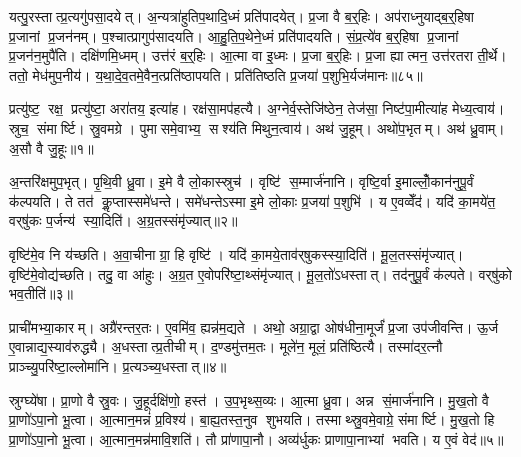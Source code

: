 यत्पु॒रस्तात्प्र॒त्यगु॑पसा॒दयेत्। अ॒न्यत्रा॑हुतिप॒थादि॒ध्मं प्रति॑पादयेत्। प्र॒जा वै ब॒र्॒हिः। अप॑राध्नुयाद्ब॒र्॒हिषा प्र॒जानां प्र॒जन॑नम्। प॒श्चात्प्रागुप॑सादयति। आ॒हु॒ति॒प॒थेने॒ध्मं प्रति॑पादयति। सं॒प्र॒त्ये॑व ब॒र्॒हिषा प्र॒जानां प्र॒जन॑न॒मुपै॑ति। दक्षि॑णमि॒ध्मम्। उत्त॑रं ब॒र्॒हिः। आ॒त्मा वा इ॒ध्मः। प्र॒जा ब॒र्॒हिः। प्र॒जा ह्यात्मन॒ उत्त॑रतरा ती॒र्थे। ततो॒ मेध॑मुप॒नीय॑। य॒था॒दे॒व॒तमे॒वैन॒त्प्रति॑ष्ठापयति। प्रति॑तिष्ठति प्र॒जया॑ प॒शुभि॒र्यज॑मानः॥८५॥



\clearpage
{}
\setcounter{anuvakam}{0}
प्रत्यु॑ष्ट॒ रक्ष॒ प्रत्यु॑ष्टा॒ अरा॑तय॒ इत्या॑ह। रक्ष॑सा॒मप॑हत्यै। अ॒ग्नेर्व॒स्तेजि॑ष्ठेन॒ तेज॑सा॒ निष्ट॑पा॒मीत्या॑ह मेध्य॒त्वाय॑। स्रुच॒ संमार्ष्टि। स्रु॒वमग्रे। पुमासमे॒वाभ्य॒ सश्य॑ति मिथुन॒त्वाय॑। अथ॑ जु॒हूम्। अथो॑प॒भृतम्। अथ॑ ध्रु॒वाम्। अ॒सौ वै जु॒हूः॥१॥

अ॒न्तरि॑क्षमुप॒भृत्। पृ॒थि॒वी ध्रु॒वा। इ॒मे वै लो॒कास्स्रुच॑। वृष्टि॑ स॒म्मार्ज॑नानि। वृष्टि॒र्वा इ॒माल्लोँ॒कान॑नुपू॒र्वं क॑ल्पयति। ते तत॑ कॢ॒प्तास्समे॑धन्ते। समे॑धन्तेऽस्मा इ॒मे लो॒काः प्र॒जया॑ प॒शुभि॑। य ए॒वव्वेँद॑। यदि॑ का॒मये॑त॒ वर्‌षु॑कः प॒र्जन्य॑ स्या॒दिति॑। अ॒ग्र॒तस्संमृ॑ज्यात्॥२॥

वृष्टि॑मे॒व नि य॑च्छति। अ॒वा॒चीनाग्रा॒ हि वृष्टि॑। यदि॑ का॒मये॒ताव॑र्‌षुकस्स्या॒दिति॑। मू॒ल॒तस्संमृ॑ज्यात्। वृष्टि॑मे॒वोद्य॑च्छति। तदु॒ वा आ॑हुः। अ॒ग्र॒त ए॒वोपरि॑ष्टा॒थ्संमृ॑ज्यात्। मू॒ल॒तो॑ऽधस्तात्। तद॑नुपू॒र्वं क॑ल्पते। वर्‌षु॑को भव॒तीति॑॥३॥

प्राची॑मभ्या॒कारम्। अग्रै॑रन्तर॒तः। ए॒वमि॑व॒ ह्यन्न॑म॒द्यते। अथो॒ अग्रा॒द्वा ओष॑धीना॒मूर्जं॑ प्र॒जा उप॑जीवन्ति। ऊ॒र्ज ए॒वान्नाद्य॒स्याव॑रुद्ध्यै। अ॒धस्तात्प्र॒तीचीम्। द॒ण्डमु॑त्तम॒तः। मूले॑न॒ मूलं॒ प्रति॑ष्ठित्यै। तस्मा॑दर॒त्नौ प्राञ्च्यु॒परि॑ष्टा॒ल्लोमा॑नि। प्र॒त्यञ्च्य॒धस्तात्॥४॥

स्रुग्घ्ये॑षा। प्रा॒णो वै स्रु॒वः। जु॒हूर्दक्षि॑णो॒ हस्त॑। उ॒प॒भृथ्स॒व्यः। आ॒त्मा ध्रु॒वा। अन्न सं॒मार्ज॑नानि। मु॒ख॒तो वै प्रा॒णो॑ऽपा॒नो भू॒त्वा। आ॒त्मान॒मन्नं॑ प्र॒विश्य॑। बा॒ह्य॒तस्त॒नुव शुभयति। तस्माथ्स्रु॒वमे॒वाग्रे॒ संमार्ष्टि। मु॒ख॒तो हि प्रा॒णो॑ऽपा॒नो भू॒त्वा। आ॒त्मान॒मन्न॑मावि॒शति॑। तौ प्रा॑णापा॒नौ। अव्य॑र्धुकः प्राणापा॒नाभ्यां भवति। य ए॒वं वेद॑॥५॥\anuvakamend[जु॒हूर्मृ॑ज्याद्भव॒तीति॑ प्र॒त्यञ्च्य॒धस्तान्मार्ष्टि॒ पञ्च॑ च]

